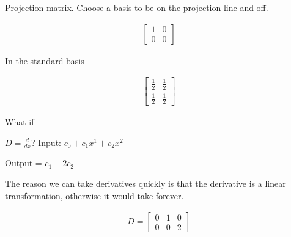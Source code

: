 \documentclass{article}
\begin{document}
Projection matrix. Choose a basis to be on the projection line and off.

\begin{align}
\begin{bmatrix}
1 & 0 \\
0 & 0
\end{bmatrix}
\end{align}

In the standard basis

\begin{align}
\begin{bmatrix}
\frac{1}{2} & \frac{1}{2} \\
\frac{1}{2} & \frac{1}{2}
\end{bmatrix}
\end{align}

What if

$D = \frac{d}{dx}$? Input: $c_0 + c_1x^1 + c_2x^2$

Output = $c_1 + 2c_2$

The reason we can take derivatives quickly is that the derivative is a linear transformation, otherwise it would take forever.

\begin{align}
D = 
\begin{bmatrix}
0 & 1 & 0 \\
0 & 0 & 2
\end{bmatrix}
\end{align}
\end{document}
